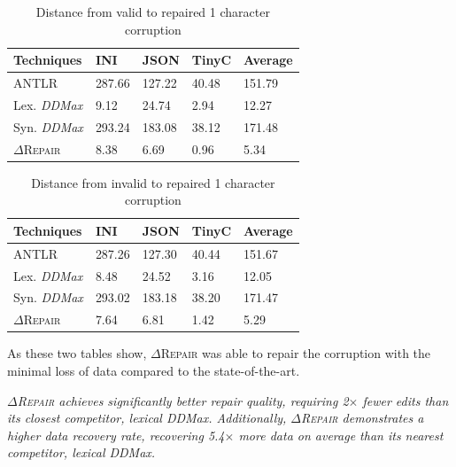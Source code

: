 \documentclass[sigconf,review,anonymous]{acmart}
\newenvironment{result}{\begin{framed}\centering\it}{\end{framed}}
\newcommand{\approach}{\textsc{$\Delta$Repair}\xspace}
\newcommand{\ANTLR}{ANTLR\xspace}
\newcommand{\ddmax}{\textit{DDMax}\xspace}
\newcommand{\drepair}{\approach}
\begin{document}
\begin{table}[!tbp]
\centering
\caption{Distance from valid to repaired 1 character corruption}
\begin{tabular}{|p{3.0cm}|p{1cm}|p{1cm}|p{1cm}|p{1cm}|}
\hline
\textbf{Techniques} & \textbf{INI} & \textbf{JSON} & \textbf{TinyC} & \textbf{Average} \\
\hline
\ANTLR & 287.66 & 127.22 & 40.48 & 151.79 \\
Lex. \ddmax & 9.12 & 24.74 & 2.94 & 12.27 \\
Syn. \ddmax & 293.24 & 183.08 & 38.12 & 171.48 \\
\drepair & 8.38 & 6.69 & 0.96 & 5.34 \\
\hline
\end{tabular}
\label{tab:validtorepaired}
\end{table}

\begin{table}[!tbp]
\centering
\caption{Distance from invalid to repaired 1 character corruption}
\begin{tabular}{|p{3.0cm}|p{1cm}|p{1cm}|p{1cm}|p{1cm}|}
\hline
\textbf{Techniques} & \textbf{INI} & \textbf{JSON} & \textbf{TinyC} & \textbf{Average} \\
\hline
\ANTLR & 287.26 & 127.30 & 40.44 & 151.67 \\
Lex. \ddmax & 8.48 & 24.52 & 3.16 & 12.05 \\
Syn. \ddmax & 293.02 & 183.18 & 38.20 & 171.47 \\
\drepair & 7.64 & 6.81 & 1.42 & 5.29 \\
\hline
\end{tabular}
\label{tab:invalidtorepaired}
\end{table}

As these two tables show, \drepair was able to repair the corruption with the
minimal loss of data compared to the state-of-the-art.


\begin{result}
\drepair achieves significantly better repair quality, requiring 2$\times$
fewer edits than its closest competitor, lexical \ddmax.
Additionally, \drepair demonstrates a higher data recovery rate, recovering
5.4$\times$ more data on average than its nearest competitor, lexical \ddmax.
\end{result}
\end{document}

